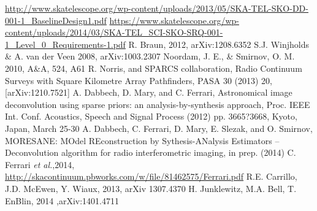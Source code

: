 \documentclass[sfheadings,a4paper,times,9pt,floats,floatfix]{article}
\begin{document}

\begin{thebibliography}{99}
  \url{http://www.skatelescope.org/wp-content/uploads/2013/05/SKA-TEL-SKO-DD-001-1_BaselineDesign1.pdf}
\url{https://www.skatelescope.org/wp-content/uploads/2014/03/SKA-TEL_SCI-SKO-SRQ-001-1_Level_0_Requirements-1.pdf}
  R. Braun, 2012, arXiv:1208.6352 
  S.J. Winjholds \& A. van der Veen 2008, arXiv:1003.2307
  {Noordam, J. E., \& Smirnov, O. M. 2010, A\&A, 524, A61}
  R. Norris, and SPARCS collaboration, Radio Continuum Surveys with Square Kilometre Array
Pathfinders, PASA 30 (2013) 20, [arXiv:1210.7521]
  A. Dabbech, D. Mary, and C. Ferrari, Astronomical image deconvolution using sparse priors: an
analysis-by-synthesis approach, Proc. IEEE Int. Conf. Acoustics, Speech and Signal Process (2012)
pp. 3665?3668, Kyoto, Japan, March 25-30
  A. Dabbech, C. Ferrari, D. Mary, E. Slezak, and O. Smirnov, MORESANE: MOdel REconstruction by
Sythesis-ANalysis Estimators – Deconvolution algorithm for radio interferometric imaging, in prep. (2014)
  C. Ferrari {\it et al.},2014, \url{http://skacontinuum.pbworks.com/w/file/81462575/Ferrari.pdf}
  R.E. Carrillo, J.D. McEwen, Y. Wiaux, 2013, arXiv 1307.4370
  H. Junklewitz, M.A. Bell, T. EnBlin, 2014 ,arXiv:1401.4711



\end{thebibliography}
\pagebreak
\appendix
\end{document}
